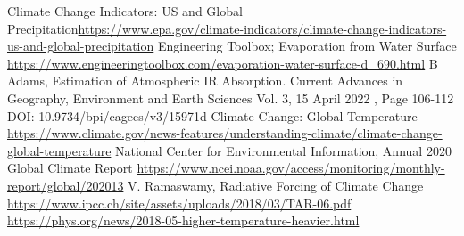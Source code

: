 \documentclass{book}
\begin{document}
	\begin{thebibliography}{99}
		 Climate Change Indicators: US and Global Precipitation\url{https://www.epa.gov/climate-indicators/climate-change-indicators-us-and-global-precipitation}
	     Engineering Toolbox; Evaporation from Water Surface \url{https://www.engineeringtoolbox.com/evaporation-water-surface-d_690.html}
	     B Adams, Estimation of Atmospheric IR Absorption. Current Advances in Geography, Environment and Earth Sciences Vol. 3, 15 April 2022 , Page 106-112  DOI: 10.9734/bpi/cagees/v3/15971d
	     Climate Change: Global Temperature \url{https://www.climate.gov/news-features/understanding-climate/climate-change-global-temperature}
	     National Center for Environmental Information,  Annual 2020 Global Climate Report \url{https://www.ncei.noaa.gov/access/monitoring/monthly-report/global/202013}
	     V. Ramaswamy, Radiative Forcing of Climate Change \url{https://www.ipcc.ch/site/assets/uploads/2018/03/TAR-06.pdf}
	     \url{https://phys.org/news/2018-05-higher-temperature-heavier.html}
	    

\end{thebibliography}
\end{document}
